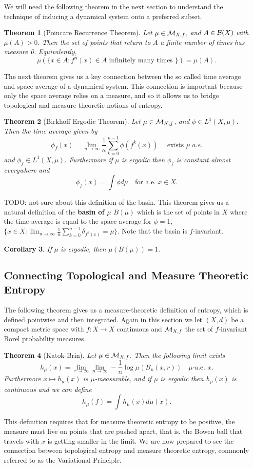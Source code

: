 \documentclass[11pt, reqno]{amsart}
\theoremstyle{plain}
\newtheorem{thm}{Theorem}[section]
\numberwithin{thm}{subsection}
\newtheorem{cor}[thm]{Corollary}
\theoremstyle{definition}
\begin{document}
We will need the following theorem in the next section to understand the technique of inducing a dynamical system onto a preferred subset.
\begin{thm}[Poincare Recurrence Theorem]
  Let $\mu \in \mathcal{M}_{X,f}$, and $A \in \mathcal{B}(X)$ with $\mu(A) > 0$. Then the set of points that return to $A$ a finite number of times has measure 0. Equivalently, 
  $$\mu(\{x \in A : f^n(x) \in A \text{ infinitely many times }\}) = \mu(A).$$
\end{thm}

The next theorem gives us a key connection between the so called time average and space average of a dynamical system. This connection is important because only the space average relies on a measure, and so it allows us to bridge topological and measure theoretic notions of entropy.
\begin{thm}[Birkhoff Ergodic Theorem]
  Let $\mu \in \mathcal{M}_{X,f}$, and $\phi \in L^1(X,\mu)$. Then the time average given by 
  $$\phi_f(x) = \lim_{n \rightarrow \infty} \frac{1}{n}\sum_{k=0}^{n-1} \phi(f^k(x))\quad\text{ exists }\mu\;a.e.$$
  and $\phi_f \in L^1(X,\mu)$. Furthermore if $\mu$ is ergodic then $\phi_f$ is constant almost everywhere and 
  $$\phi_f(x) = \int \phi d\mu \quad \text{for a.e. }x \in X.$$
\end{thm}

TODO: not sure about this definition of the basin. This theorem gives us a natural definition of the \textbf{basin of $\mu$} $B(\mu)$ which is the set of points in $X$ where the time average is equal to the space average for $\phi = 1$, $\{x \in X : \lim_{n\rightarrow \infty} \frac{1}{n}\sum_{k=0}^{n-1}\delta_{f^k(x)} = \mu\}$. Note that the basin is $f$-invariant.
\begin{cor}
  If $\mu$ is ergodic, then $\mu(B(\mu)) = 1$.
\end{cor}

\subsection{Connecting Topological and Measure Theoretic Entropy}\cite[L10, L11]{wolf}
The following theorem gives us a measure-theoretic definition of entropy, which is defined pointwise and then integrated. Again in this section we let $(X,d)$ be a compact metric space with $f: X \rightarrow X$ continuous and $\mathcal{M}_{X,f}$ the set of $f$-invariant Borel probability measures. 
\begin{thm}[Katok-Brin]
  Let $\mu \in \mathcal{M}_{X,f}$. Then the following limit exists 
  $$h_\mu(x) = \lim_{r \rightarrow \infty} \lim_{n \rightarrow \infty} - \frac{1}{n} \log \mu(B_n(x, r)) \quad \mu\text{-a.e. } x.$$
  Furthermore $x \mapsto h_\mu(x)$ is $\mu$-measurable, and if $\mu$ is ergodic then $h_\mu(x)$ is continuous and we can define 
  $$h_\mu(f) = \int h_\mu(x)d\mu(x).$$
\end{thm}
This definition requires that for measure theoretic entropy to be positive, the measure must live on points that are pushed apart, that is, the Bowen ball that travels with $x$ is getting smaller in the limit. We are now prepared to see the connection between topological entropy and measure theoretic entropy, commonly referred to as the Variational Principle.
\end{document}
